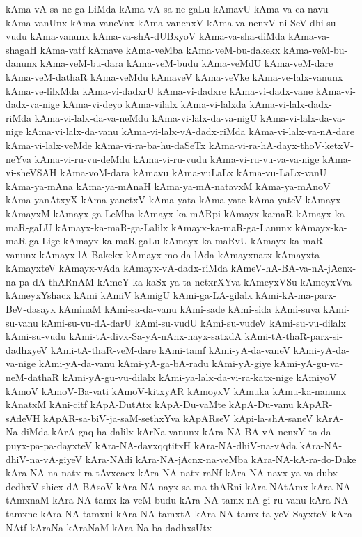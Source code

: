 {kAma-vA-sa-ne-ga-LiMda
kAma-vA-sa-ne-gaLu
kAmavU
kAma-va-ca-navu
kAma-vanUnx
kAma-vaneVnx
kAma-vanenxV
kAma-va-nenxV-ni-SeV-dhi-su-vudu
kAma-vanunx
kAma-va-shA-dUBxyoV
kAma-va-sha-diMda
kAma-va-shagaH
kAma-vatf
kAmave
kAma-veMba
kAma-veM-bu-dakekx
kAma-veM-bu-danunx
kAma-veM-bu-dara
kAma-veM-budu
kAma-veMdU
kAma-veM-dare
kAma-veM-dathaR
kAma-veMdu
kAmaveV
kAma-veVke
kAma-ve-lalx-vanunx
kAma-ve-lilxMda
kAma-vi-dadxrU
kAma-vi-dadxre
kAma-vi-dadx-vane
kAma-vi-dadx-va-nige
kAma-vi-deyo
kAma-vilalx
kAma-vi-lalxda
kAma-vi-lalx-dadx-riMda
kAma-vi-lalx-da-va-neMdu
kAma-vi-lalx-da-va-nigU
kAma-vi-lalx-da-va-nige
kAma-vi-lalx-da-vanu
kAma-vi-lalx-vA-dadx-riMda
kAma-vi-lalx-va-nA-dare
kAma-vi-lalx-veMde
kAma-vi-ra-ba-hu-daSeTx
kAma-vi-ra-hA-dayx-thoV-ketxV-neYva
kAma-vi-ru-vu-deMdu
kAma-vi-ru-vudu
kAma-vi-ru-vu-va-va-nige
kAma-vi-sheVSAH
kAma-voM-dara
kAmavu
kAma-vuLaLx
kAma-vu-LaLx-vanU
kAma-ya-mAna
kAma-ya-mAnaH
kAma-ya-mA-natavxM
kAma-ya-mAnoV
kAma-yanAtxyX
kAma-yanetxV
kAma-yata
kAma-yate
kAma-yateV
kAmayx
kAmayxM
kAmayx-ga-LeMba
kAmayx-ka-mARpi
kAmayx-kamaR
kAmayx-ka-maR-gaLU
kAmayx-ka-maR-ga-Lalilx
kAmayx-ka-maR-ga-Lanunx
kAmayx-ka-maR-ga-Lige
kAmayx-ka-maR-gaLu
kAmayx-ka-maRvU
kAmayx-ka-maR-vanunx
kAmayx-lA-Bakekx
kAmayx-mo-da-lAda
kAmayxnatx
kAmayxta
kAmayxteV
kAmayx-vAda
kAmayx-vA-dadx-riMda
kAmeV-hA-BA-va-nA-jAcnx-na-pa-dA-thARnAM
kAmeY-ka-kaSx-ya-ta-netxrXYva
kAmeyxVSu
kAmeyxVva
kAmeyxYshacx
kAmi
kAmiV
kAmigU
kAmi-ga-LA-gilalx
kAmi-kA-ma-parx-BeV-dasayx
kAminaM
kAmi-sa-da-vanu
kAmi-sade
kAmi-sida
kAmi-suva
kAmi-su-vanu
kAmi-su-vu-dA-darU
kAmi-su-vudU
kAmi-su-vudeV
kAmi-su-vu-dilalx
kAmi-su-vudu
kAmi-tA-divx-Sa-yA-nAnx-nayx-satxdA
kAmi-tA-thaR-parx-si-dadhxyeV
kAmi-tA-thaR-veM-dare
kAmi-tamf
kAmi-yA-da-vaneV
kAmi-yA-da-va-nige
kAmi-yA-da-vanu
kAmi-yA-ga-bA-radu
kAmi-yA-giye
kAmi-yA-gu-va-neM-dathaR
kAmi-yA-gu-vu-dilalx
kAmi-ya-lalx-da-vi-ra-katx-nige
kAmiyoV
kAmoV
kAmoV-Ba-vati
kAmoV-kitxyAR
kAmoyxV
kAmuka
kAmu-ka-nanunx
kAnatxM
kAni-citf
kApA-DutAtx
kApA-Du-vaMte
kApA-Du-vanu
kApAR-sAdeVH
kApAR-sa-biV-ja-saM-sethxYva
kApARseV
kApi-la-shA-saneV
kArA-Na-diMda
kArA-gaq-ha-dalilx
kArNa-vanunx
kAra-NA-BA-vA-nenxY-ta-da-puyx-pa-pa-dayxteV
kAra-NA-davxqqtitxH
kAra-NA-dhiV-na-vAda
kAra-NA-dhiV-na-vA-giyeV
kAra-NAdi
kAra-NA-jAcnx-na-veMba
kAra-NA-kA-ra-do-Dake
kAra-NA-na-natx-ra-tAvxcacx
kAra-NA-natx-raNf
kAra-NA-navx-ya-va-dubx-dedhxV-shicx-dA-BAsoV
kAra-NA-nayx-sa-ma-thARni
kAra-NAtAmx
kAra-NA-tAmxnaM
kAra-NA-tamx-ka-veM-budu
kAra-NA-tamx-nA-gi-ru-vanu
kAra-NA-tamxne
kAra-NA-tamxni
kAra-NA-tamxtA
kAra-NA-tamx-ta-yeV-SayxteV
kAra-NAtf
kAraNa
kAraNaM
kAra-Na-ba-dadhxsUtx
}
